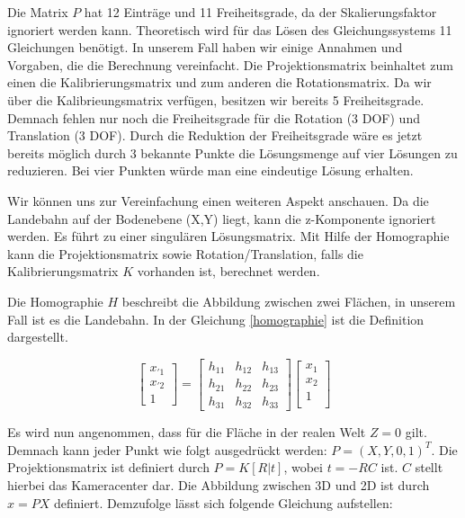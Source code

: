 \documentclass{ezb}
\begin{document}
Die Matrix $P$ hat 12 Einträge und 11 Freiheitsgrade, da der Skalierungsfaktor ignoriert werden kann. Theoretisch wird für das Lösen des Gleichungssystems 11 Gleichungen benötigt. In unserem Fall haben wir einige Annahmen und Vorgaben, die die Berechnung vereinfacht. Die Projektionsmatrix beinhaltet zum einen die Kalibrierungsmatrix und zum anderen die Rotationsmatrix. Da wir über die Kalibrieungsmatrix verfügen, besitzen wir bereits 5 Freiheitsgrade. Demnach fehlen nur noch die Freiheitsgrade für die Rotation (3 DOF) und Translation (3 DOF). Durch die Reduktion der Freiheitsgrade wäre es jetzt bereits möglich durch 3 bekannte Punkte die Lösungsmenge auf vier Lösungen zu reduzieren. Bei vier Punkten würde man eine eindeutige Lösung erhalten.

Wir können uns zur Vereinfachung einen weiteren Aspekt anschauen. Da die Landebahn auf der Bodenebene (X,Y) liegt, kann die z-Komponente ignoriert werden. Es führt zu einer singulären Lösungsmatrix. Mit Hilfe der Homographie kann die Projektionsmatrix sowie Rotation/Translation, falls die Kalibrierungsmatrix $K$ vorhanden ist, berechnet werden.

Die Homographie $H$ beschreibt die Abbildung zwischen zwei Flächen, in unserem Fall ist es die Landebahn. In der Gleichung \ref{homographie} ist die Definition dargestellt.

\begin{equation} \label{homographie}
\begin{bmatrix}
x_{'1} \\
x_{'2} \\
1 
\end{bmatrix}
=
\begin{bmatrix}
h_{11} & h_{12} & h_{13} \\
h_{21} & h_{22} & h_{23} \\
h_{31} & h_{32} & h_{33} 
\end{bmatrix}
\begin{bmatrix}
x_{1} \\
x_{2} \\
1 \\
\end{bmatrix}
\end{equation} 

Es wird nun angenommen, dass für die Fläche in der realen Welt $Z=0$ gilt. Demnach kann jeder Punkt wie folgt ausgedrückt werden: $P=(X, Y, 0, 1)^T$.
Die Projektionsmatrix ist definiert durch $P=K[R|t]$, wobei $t=-RC$ ist. $C$ stellt hierbei das Kameracenter dar. Die Abbildung zwischen 3D und 2D ist durch $x=PX$ definiert. Demzufolge lässt sich folgende Gleichung aufstellen:
\end{document}
